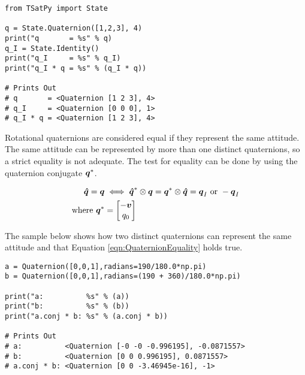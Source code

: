 \begin{singlespace}
  \begin{verbatim}
from TSatPy import State

q = State.Quaternion([1,2,3], 4)
print("q       = %s" % q)
q_I = State.Identity()
print("q_I     = %s" % q_I)
print("q_I * q = %s" % (q_I * q))

# Prints Out
# q       = <Quaternion [1 2 3], 4>
# q_I     = <Quaternion [0 0 0], 1>
# q_I * q = <Quaternion [1 2 3], 4>
  \end{verbatim}
  \nocite{minted}
\end{singlespace}

Rotational quaternions are considered equal if they represent the same attitude.  The same attitude can be represented by more than one distinct quaternions, so a strict equality is not adequate.  The test for equality can be done by using the quaternion conjugate $\boldsymbol{q}^*$.

\begin{subequations}
  \begin{align}
    \boldsymbol{\hat{q}} = \boldsymbol{q} & \iff \boldsymbol{\hat{q}}^* \otimes \boldsymbol{q} = \boldsymbol{q}^* \otimes \boldsymbol{\hat{q}} = \boldsymbol{q}_I \text{ or } -\boldsymbol{q}_I \\
    \text{where } \boldsymbol{q}^* &= \begin{bmatrix} -\boldsymbol{v} \\ q_0 \end{bmatrix}
  \end{align}
  \label{eqn:QuaternionEquality}
\end{subequations}

The sample below shows how two distinct quaternions can represent the same attitude and that Equation \ref{eqn:QuaternionEquality} holds true.

\begin{singlespace}
  \begin{verbatim}
a = Quaternion([0,0,1],radians=190/180.0*np.pi)
b = Quaternion([0,0,1],radians=(190 + 360)/180.0*np.pi)

print("a:          %s" % (a))
print("b:          %s" % (b))
print("a.conj * b: %s" % (a.conj * b))

# Prints Out
# a:          <Quaternion [-0 -0 -0.996195], -0.0871557>
# b:          <Quaternion [0 0 0.996195], 0.0871557>
# a.conj * b: <Quaternion [0 0 -3.46945e-16], -1>
  \end{verbatim}
\nocite{minted}
\end{singlespace}

